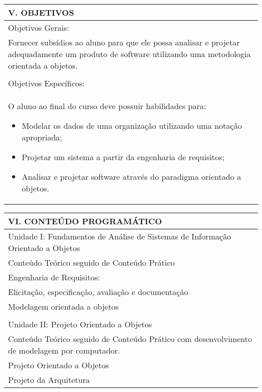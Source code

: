 \documentclass[12pt]{article}
\begin{document}
\begin{longtable}{|L{1.025\textwidth}|} \hline
%
{\bf V. OBJETIVOS } \\ \hline
%
Objetivos Gerais: \\
Fornecer subsídios ao aluno para que ele possa analisar e projetar adequadamente um produto de software utilizando uma metodologia orientada a objetos.\\
 \\
Objetivos Específicos:\\

O aluno ao final do curso deve possuir habilidades para:
\begin{itemize}
\item Modelar os dados de uma organização utilizando uma notação apropriada;
\item Projetar um sistema a partir da engenharia de requisitos;
\item Analisar e projetar software através do paradigma orientado a objetos.
\end{itemize}

\\ \hline
\end{longtable}


\begin{longtable}{|L{1.025\textwidth}|} \hline
%
{\bf VI. CONTEÚDO PROGRAMÁTICO } \\ \hline

Unidade I: Fundamentos de Análise de Sistemas de Informação Orientado a Objetos\\
Conteúdo Teórico seguido de Conteúdo Prático \\
Engenharia de Requisitos:\\
Elicitação, especificação, avaliação e documentação\\
Modelagem orientada a objetos\\
\\
Unidade II: Projeto Orientado a Objetos\\
Conteúdo Teórico seguido de Conteúdo Prático com desenvolvimento de modelagem por computador. \\
Projeto Orientado a Objetos\\
Projeto da Arquitetura
\\ \hline
\end{longtable} 
\end{document}
